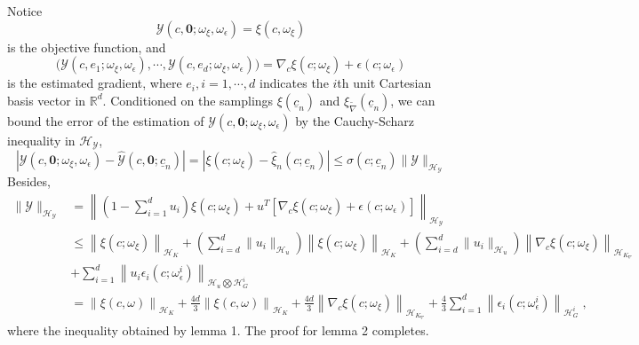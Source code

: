 Notice 
\begin{equation*}
    \mathcal{Y}(c, \mathbf{0};\omega_\xi, \omega_\epsilon) = \xi(c, \omega_\xi)
\end{equation*}
is the objective function, and
\begin{equation*}
    \Big( \mathcal{Y}(c, e_1;\omega_\xi,\omega_\epsilon), \cdots, \mathcal{Y}(c, e_d;\omega_\xi, \omega_\epsilon)\Big) 
    = \nabla_c\xi(c;\omega_\xi) + \epsilon(c;\omega_\epsilon)
\end{equation*}
is the estimated gradient,
where $e_i, i=1,\cdots, d$ indicates the $i$th unit Cartesian basis vector in $\mathbb{R}^d$.
Conditioned on the samplings $\xi(\underline{c}_n)$ and $\xi_{\tilde{\nabla}}(\underline{c}_n)$,
we can bound the error of the estimation of $\mathcal{Y}(c,\mathbf{0};\omega_\xi,\omega_\epsilon)$ by
the Cauchy-Scharz inequality \cite{RKHS book} in $\mathcal{H}_{\mathcal{Y}}$,
\begin{equation*}
    \left|\mathcal{Y}(c,\mathbf{0};\omega_\xi,\omega_\epsilon) - \hat{\mathcal{Y}}(c,\mathbf{0};\underline{c}_n)\right| =
    \left|\xi(c;\omega_\xi) - \hat{\xi}_n(c;\underline{c}_n)\right| \le
    \sigma(c;\underline{c}_n) \|\mathcal{Y}\|_{\mathcal{H}_{\mathcal{Y}}}
\end{equation*}
Besides,
\begin{equation*}\begin{split}
    \|\mathcal{Y}\|_{\mathcal{H}_{\mathcal{Y}}} &= \left\|
        \left(1-\sum_{i=1}^d u_i\right) \xi(c; \omega_\xi) + u^T
        \left[\nabla_c\xi(c;\omega_\xi) + \epsilon(c;\omega_\epsilon) \right]
    \right\|_{\mathcal{H}_{\mathcal{Y}}}\\
    &\le \left\| \xi(c; \omega_\xi) \right\|_{\mathcal{H}_K}
      + \left(\sum_{i=d}^d \|u_i\|_{\mathcal{H}_u} \right)
        \left\|\xi(c;\omega_\xi)\right\|_{\mathcal{H}_K}
      + \left(\sum_{i=d}^d \|u_i\|_{\mathcal{H}_u} \right)
        \left\|\nabla_c \xi(c;\omega_\xi)\right\|_{\mathcal{H}_{K_\nabla}}\\
      &+ \sum_{i=1}^d \left\| u_i \epsilon_i(c;\omega_\epsilon^i)
        \right\|_{\mathcal{H}_u\bigotimes \mathcal{H}_G^i}\\
    &= \left\| \xi(c, \omega) \right\|_{\mathcal{H}_K}
      + \frac{4d}{3} \left\|\xi(c,\omega)\right\|_{\mathcal{H}_K}
      + \frac{4d}{3}\left\| \nabla_c \xi(c;\omega_\xi)
        \right\|_{\mathcal{H}_{K_\nabla}}
      + \frac{4}{3}\sum_{i=1}^d \left\| \epsilon_i(c;\omega_\epsilon^i) \right\|_{\mathcal{H}_G^i}\;,
\end{split}\label{eqn: CS ineq}
\end{equation*}
where the inequality obtained by lemma 1. The proof for lemma 2 completes.\\

